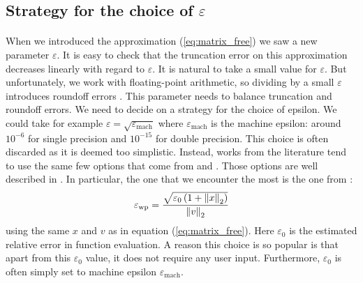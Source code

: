     \subsection{Strategy for the choice of \texorpdfstring{$\varepsilon$}{epsilon}}

      \paragraph{}
      When we introduced the approximation (\ref{eq:matrix_free}) we saw a new parameter $\varepsilon$.
      It is easy to check that the truncation error on this approximation decreases linearly with regard to $\varepsilon$.
      It is natural to take a small value for $\varepsilon$.
      But unfortunately, we work with floating-point arithmetic, so dividing by a small $\varepsilon$ introduces roundoff errors \cite{Martel2006}.
      This parameter needs to balance truncation and roundoff errors.
      We need to decide on a strategy for the choice of epsilon.
      We could take for example $\varepsilon = \sqrt{\varepsilon_\textrm{mach}}$ where $\varepsilon_\textrm{mach}$ is the machine epsilon: around $10^{-6}$ for single precision and $10^{-15}$ for double precision.
      This choice is often discarded as it is deemed too simplistic.
      Instead, works from the literature tend to use the same few options \cite{ParkNourgalievMartineauEtAl2009, LiuZhangZhongEtAl2015, AbhyankarBrownConstantinescuEtAl2018} that come from \cite{PerniceWalker1998} and \cite{DennisSchnabel1996}.
      Those options are well described in \cite{KnollKeyes2004}.
      In particular, the one that we encounter the most is the one from \cite{PerniceWalker1998}:
      \begin{equation}\label{eq:epsilon_wp}
        \varepsilon_\textrm{wp} = \frac{\sqrt{\varepsilon_0 \left(1 + \norm[2]{x}\right) }}{\norm[2]{v}}
      \end{equation}
      using the same $x$ and $v$ as in equation (\ref{eq:matrix_free}).
      Here $\varepsilon_0$ is the estimated relative error in function evaluation.
      A reason this choice is so popular is that apart from this $\varepsilon_0$ value, it does not require any user input.
      Furthermore, $\varepsilon_0$ is often simply set to machine epsilon $\varepsilon_\textrm{mach}$.

